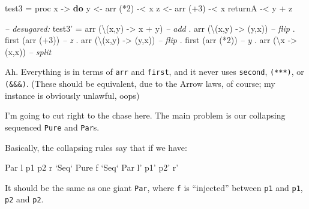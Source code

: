 \documentclass[]{article}
\newenvironment{Shaded}{}{}
\newcommand{\KeywordTok}[1]{\textcolor[rgb]{0.00,0.44,0.13}{\textbf{{#1}}}}
\newcommand{\DataTypeTok}[1]{\textcolor[rgb]{0.56,0.13,0.00}{{#1}}}
\newcommand{\DecValTok}[1]{\textcolor[rgb]{0.25,0.63,0.44}{{#1}}}
\newcommand{\CommentTok}[1]{\textcolor[rgb]{0.38,0.63,0.69}{\textit{{#1}}}}
\newcommand{\OtherTok}[1]{\textcolor[rgb]{0.00,0.44,0.13}{{#1}}}
\newcommand{\FunctionTok}[1]{\textcolor[rgb]{0.02,0.16,0.49}{{#1}}}
\newcommand{\NormalTok}[1]{{#1}}
\begin{document}
\begin{Shaded}
\begin{Highlighting}[]
\NormalTok{test3 }\FunctionTok{=} \NormalTok{proc x }\OtherTok{->} \KeywordTok{do}
    \NormalTok{y }\OtherTok{<-} \NormalTok{arr (}\FunctionTok{*}\DecValTok{2}\NormalTok{) }\FunctionTok{-<} \NormalTok{x}
    \NormalTok{z }\OtherTok{<-} \NormalTok{arr (}\FunctionTok{+}\DecValTok{3}\NormalTok{) }\FunctionTok{-<} \NormalTok{x}
    \NormalTok{returnA }\FunctionTok{-<} \NormalTok{y }\FunctionTok{+} \NormalTok{z}

\CommentTok{-- desugared:}
\NormalTok{test3' }\FunctionTok{=} \NormalTok{arr (\textbackslash{}(x,y) }\OtherTok{->} \NormalTok{x }\FunctionTok{+} \NormalTok{y)     }\CommentTok{-- add}
       \FunctionTok{.} \NormalTok{arr (\textbackslash{}(x,y) }\OtherTok{->} \NormalTok{(y,x))     }\CommentTok{-- flip}
       \FunctionTok{.} \NormalTok{first (arr (}\FunctionTok{+}\DecValTok{3}\NormalTok{))          }\CommentTok{-- z}
       \FunctionTok{.} \NormalTok{arr (\textbackslash{}(x,y) }\OtherTok{->} \NormalTok{(y,x))     }\CommentTok{-- flip}
       \FunctionTok{.} \NormalTok{first (arr (}\FunctionTok{*}\DecValTok{2}\NormalTok{))          }\CommentTok{-- y}
       \FunctionTok{.} \NormalTok{arr (\textbackslash{}x }\OtherTok{->} \NormalTok{(x,x))         }\CommentTok{-- split}
\end{Highlighting}
\end{Shaded}

Ah. Everything is in terms of \texttt{arr} and \texttt{first}, and it
never uses \texttt{second}, \texttt{(***)}, or \texttt{(\&\&\&)}. (These
should be equivalent, due to the Arrow laws, of course; my instance is
obviously unlawful, oops)

I'm going to cut right to the chase here. The main problem is our
collapsing sequenced \texttt{Pure} and \texttt{Par}s.

Basically, the collapsing rules say that if we have:

\begin{Shaded}
\begin{Highlighting}[]
\DataTypeTok{Par} \NormalTok{l p1 p2 r }\OtherTok{`Seq`} \DataTypeTok{Pure} \NormalTok{f }\OtherTok{`Seq`} \DataTypeTok{Par} \NormalTok{l' p1' p2' r'}
\end{Highlighting}
\end{Shaded}

It should be the same as one giant \texttt{Par}, where \texttt{f} is
``injected'' between \texttt{p1} and \texttt{p1\textquotesingle{}},
\texttt{p2} and \texttt{p2\textquotesingle{}}.
\end{document}
